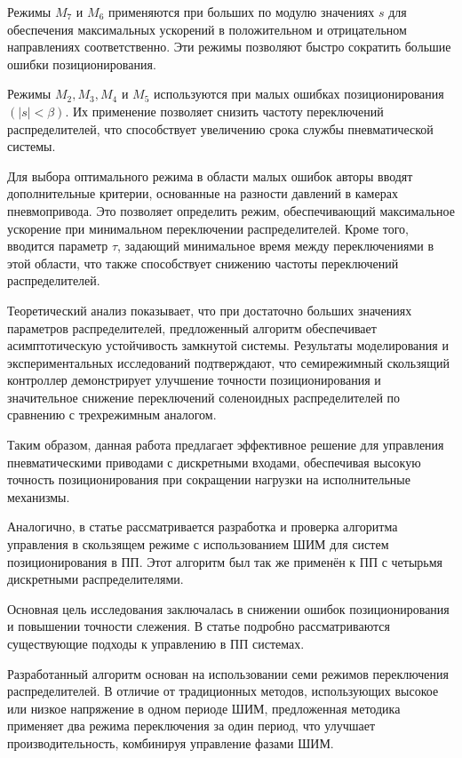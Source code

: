 Режимы $M_7$ и $M_6$ применяются при больших по модулю значениях $s$ для обеспечения максимальных ускорений в положительном и
отрицательном направлениях соответственно. Эти режимы позволяют быстро сократить большие ошибки позиционирования.

Режимы $M_2, M_3, M_4$ и $M_5$ используются при малых ошибках позиционирования $(\lvert s \rvert < \beta)$. Их применение позволяет снизить частоту
переключений распределителей, что способствует увеличению срока службы пневматической системы.

Для выбора оптимального режима в области малых ошибок авторы вводят дополнительные критерии, основанные на разности давлений
в камерах пневмопривода. Это позволяет определить режим, обеспечивающий максимальное ускорение при минимальном переключении
распределителей. Кроме того, вводится параметр $\tau$, задающий минимальное время между переключениями в этой области, что также
способствует снижению частоты переключений распределителей.

Теоретический анализ показывает, что при достаточно больших значениях параметров распределителей, предложенный алгоритм
обеспечивает асимптотическую устойчивость замкнутой системы. Результаты моделирования и экспериментальных исследований подтверждают,
что семирежимный скользящий контроллер демонстрирует улучшение точности позиционирования и значительное снижение переключений соленоидных
распределителей по сравнению с трехрежимным аналогом.

Таким образом, данная работа предлагает эффективное решение для управления пневматическими приводами с дискретными входами, обеспечивая
высокую точность позиционирования при сокращении нагрузки на исполнительные механизмы.


Аналогично, в статье \cite*{Zhonglin} рассматривается разработка и проверка алгоритма управления в скользящем режиме с
использованием ШИМ для систем позиционирования в ПП. Этот алгоритм был так же применён к ПП с четырьмя дискретными распределителями.

Основная цель исследования заключалась в снижении ошибок позиционирования и повышении точности слежения. В статье подробно рассматриваются существующие подходы к управлению в ПП системах.

Разработанный алгоритм основан на использовании семи режимов переключения распределителей. В отличие от традиционных методов,
использующих высокое или низкое напряжение в одном периоде ШИМ, предложенная методика применяет два режима переключения за один период,
что улучшает производительность, комбинируя управление фазами ШИМ.

